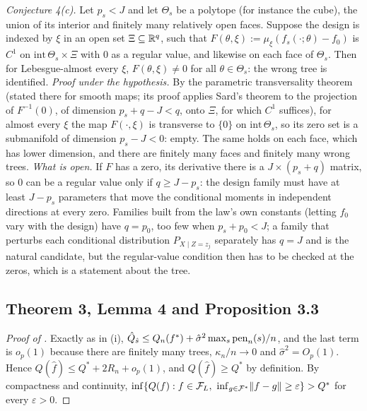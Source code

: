 \medskip\noindent{}\label{res:Conjecture4(c)}\emph{Conjecture 4(c).} Let $p_s < J$ and let $\Theta_s$ be a polytope (for instance the cube), the union of its interior and finitely many relatively open faces. Suppose the design is indexed by $\xi$ in an open set $\Xi \subseteq \mathbb{R}^q$, such that $F(\theta, \xi) := \mu_\xi(f_s(\cdot;\theta) - f_0)$ is $C^1$ on $\mathrm{int}\,\Theta_s \times \Xi$ with $0$ as a regular value, and likewise on each face of $\Theta_s$. Then for Lebesgue-almost every $\xi$, $F(\theta, \xi) \ne 0$ for all $\theta \in \Theta_s$: the wrong tree is identified. \emph{Proof under the hypothesis.} By the parametric transversality theorem \citep[\S 2.3]{guilleminpollack1974} (stated there for smooth maps; its proof applies Sard's theorem to the projection of $F^{-1}(0)$, of dimension $p_s + q - J < q$, onto $\Xi$, for which $C^1$ suffices), for almost every $\xi$ the map $F(\cdot, \xi)$ is transverse to $\{0\}$ on $\mathrm{int}\,\Theta_s$, so its zero set is a submanifold of dimension $p_s - J < 0$: empty. The same holds on each face, which has lower dimension, and there are finitely many faces and finitely many wrong trees. \emph{What is open.} If $F$ has a zero, its derivative there is a $J \times (p_s + q)$ matrix, so $0$ can be a regular value only if $q \ge J - p_s$: the design family must have at least $J - p_s$ parameters that move the conditional moments in independent directions at every zero. Families built from the law's own constants (letting $f_0$ vary with the design) have $q = p_0$, too few when $p_s + p_0 < J$; a family that perturbs each conditional distribution $P_{X \mid Z = z_j}$ separately has $q = J$ and is the natural candidate, but the regular-value condition then has to be checked at the zeros, which is a statement about the tree.

\subsection{Theorem 3, Lemma 4 and Proposition 3.3}

\begin{proof}[Proof of ]
Exactly as in (i), $\hat Q_{\hat s} \le Q_n(f^*) + \hat\sigma^2\max_s\mathrm{pen}_n(s)/n$, and the last term is $o_p(1)$ because there are finitely many trees, $\kappa_n/n \to 0$ and $\hat\sigma^2 = O_p(1)$. Hence $Q(\hat f) \le Q^* + 2R_n + o_p(1)$, and $Q(\hat f) \ge Q^*$ by definition. By compactness and continuity, $\inf\{Q(f) : f \in \mathcal{F}_L,\ \inf_{g \in \mathcal{F}^*}\lVert f - g\rVert \ge \varepsilon\} > Q^*$ for every $\varepsilon > 0$.
\end{proof}

